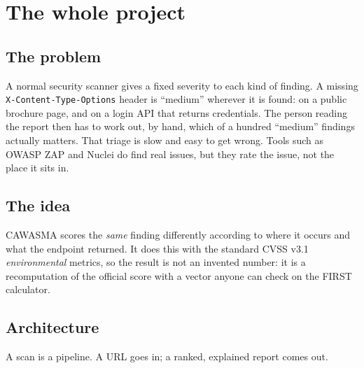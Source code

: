 \section{The whole project}

\subsection{The problem}
A normal security scanner gives a fixed severity to each kind of finding. A
missing \texttt{X-Content-Type-Options} header is ``medium'' wherever it is
found: on a public brochure page, and on a login API that returns credentials.
The person reading the report then has to work out, by hand, which of a hundred
``medium'' findings actually matters. That triage is slow and easy to get
wrong. Tools such as OWASP ZAP and Nuclei do find real issues, but they rate
the issue, not the place it sits in.

\subsection{The idea}
CAWASMA scores the \emph{same} finding differently according to where it occurs
and what the endpoint returned. It does this with the standard CVSS v3.1
\emph{environmental} metrics, so the result is not an invented number: it is a
recomputation of the official score with a vector anyone can check on the FIRST
calculator.


\subsection{Architecture}
A scan is a pipeline. A URL goes in; a ranked, explained report comes out.

